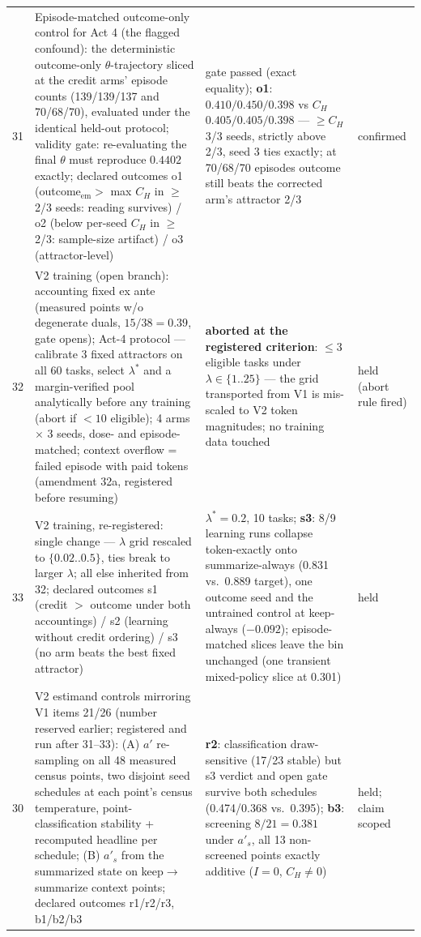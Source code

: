 \documentclass{article}
\theoremstyle{remark}
\begin{document}
\begin{table}[h]
{\begin{tabular}{clll}
31 & Episode-matched outcome-only control for Act 4 (the flagged confound): the deterministic outcome-only $\theta$-trajectory sliced at the credit arms' episode counts (139/139/137 and 70/68/70), evaluated under the identical held-out protocol; validity gate: re-evaluating the final $\theta$ must reproduce $0.4402$ exactly; declared outcomes o1 (outcome$_{\text{em}} >$ max $C_H$ in $\geq$2/3 seeds: reading survives) / o2 (below per-seed $C_H$ in $\geq$2/3: sample-size artifact) / o3 (attractor-level) & gate passed (exact equality); \textbf{o1}: $0.410/0.450/0.398$ vs $C_H$ $0.405/0.405/0.398$ --- $\geq C_H$ 3/3 seeds, strictly above 2/3, seed 3 ties exactly; at 70/68/70 episodes outcome still beats the corrected arm's attractor 2/3 & confirmed \\
32 & V2 training (open branch): accounting fixed ex ante (measured points w/o degenerate duals, $15/38=0.39$, gate opens); Act-4 protocol --- calibrate 3 fixed attractors on all 60 tasks, select $\lambda^{*}$ and a margin-verified pool analytically before any training (abort if $<10$ eligible); 4 arms $\times$ 3 seeds, dose- and episode-matched; context overflow = failed episode with paid tokens (amendment 32a, registered before resuming) & \textbf{aborted at the registered criterion}: $\leq 3$ eligible tasks under $\lambda \in \{1..25\}$ --- the grid transported from V1 is mis-scaled to V2 token magnitudes; no training data touched & held (abort rule fired) \\
33 & V2 training, re-registered: single change --- $\lambda$ grid rescaled to $\{0.02..0.5\}$, ties break to larger $\lambda$; all else inherited from 32; declared outcomes s1 (credit $>$ outcome under both accountings) / s2 (learning without credit ordering) / s3 (no arm beats the best fixed attractor) & $\lambda^{*}=0.2$, 10 tasks; \textbf{s3}: 8/9 learning runs collapse token-exactly onto summarize-always (0.831 vs.\ 0.889 target), one outcome seed and the untrained control at keep-always ($-0.092$); episode-matched slices leave the bin unchanged (one transient mixed-policy slice at 0.301) & held \\
30 & V2 estimand controls mirroring V1 items 21/26 (number reserved earlier; registered and run after 31--33): (A) $a'$ re-sampling on all 48 measured census points, two disjoint seed schedules at each point's census temperature, point-classification stability + recomputed headline per schedule; (B) $a'_s$ from the summarized state on keep$\to$summarize context points; declared outcomes r1/r2/r3, b1/b2/b3 & \textbf{r2}: classification draw-sensitive (17/23 stable) but s3 verdict and open gate survive both schedules (0.474/0.368 vs.\ 0.395); \textbf{b3}: screening $8/21=0.381$ under $a'_s$, all 13 non-screened points exactly additive ($I=0$, $C_H\neq 0$) & held; claim scoped \\

\end{tabular}}
\end{table}
\end{document}
